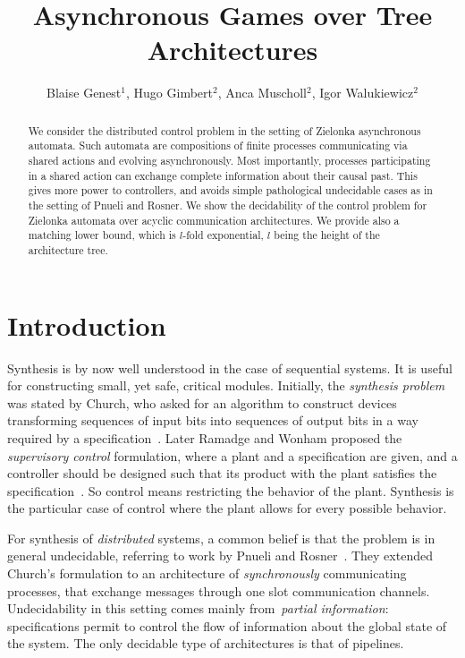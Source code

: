\documentclass{llncs}
\begin{document}
\title{Asynchronous Games over Tree Architectures}


\author{Blaise Genest$^{1}$, Hugo Gimbert$^2$, Anca Muscholl$^{2}$,
  Igor Walukiewicz$^2$}


\maketitle

\begin{abstract}
 We consider the distributed control problem in the setting of
  Zielonka asynchronous automata. 
  Such automata are compositions of finite processes
  communicating via shared actions and evolving asynchronously. Most
  importantly, processes participating in a shared action can exchange
  complete information about their causal past. This gives more power
  to controllers, and avoids simple pathological undecidable cases as
  in the setting of Pnueli
  and Rosner.
  We show the decidability of the control problem for
  Zielonka automata over acyclic communication architectures.  We
  provide also a matching lower bound, which is $l$-fold exponential,
  $l$ being the height of the architecture tree.
\end{abstract}


\section{Introduction}\label{sec:intro}
Synthesis is by now well understood in the case of sequential systems.
It is useful for constructing small, yet safe, critical modules.
Initially, the {\em synthesis problem} was stated by Church, who asked
for an algorithm to construct devices transforming sequences of input
bits into sequences of output bits in a way required by a
specification~\cite{church62}. Later Ramadge and Wonham proposed the
{\em supervisory control} formulation, where a plant and a
specification are given, and a controller should be designed such that
its product with the plant satisfies the specification~\cite{RW89}. So
control means restricting the behavior of the plant. Synthesis is the
particular case of control where the plant allows for every possible
behavior.

For synthesis of {\em distributed} systems, a common belief is that the
problem is in general undecidable, referring to work by Pnueli and
Rosner~\cite{PR90}. They extended Church's 
formulation to an architecture of {\em synchronously} communicating
processes, that exchange messages through one slot communication
channels. Undecidability in this setting comes mainly from~\emph{partial
information}: specifications permit to control the flow of information about the global state of the system. The only
decidable type of architectures is that of pipelines.
\end{document}
